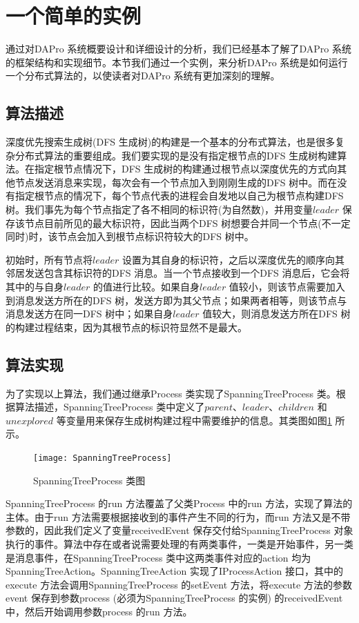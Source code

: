     \section{一个简单的实例}
    通过对DAPro 系统概要设计和详细设计的分析，我们已经基本了解了DAPro 系统的框架结构和实现细节。本节我们通过一个实例，来分析DAPro 系统是如何运行一个分布式算法的，以使读者对DAPro 系统有更加深刻的理解。

    \subsection{算法描述}
    深度优先搜索生成树(DFS 生成树)的构建是一个基本的分布式算法，也是很多复杂分布式算法的重要组成。我们要实现的是没有指定根节点的DFS 生成树构建算法。在指定根节点情况下，DFS 生成树的构建通过根节点以深度优先的方式向其他节点发送消息来实现，每次会有一个节点加入到刚刚生成的DFS 树中。而在没有指定根节点的情况下，每个节点代表的进程会自发地以自己为根节点构建DFS 树。我们事先为每个节点指定了各不相同的标识符(为自然数)，并用变量$leader$ 保存该节点目前所见的最大标识符，因此当两个DFS 树想要合并同一个节点(不一定同时)时，该节点会加入到根节点标识符较大的DFS 树中。

    初始时，所有节点将$leader$ 设置为其自身的标识符，之后以深度优先的顺序向其邻居发送包含其标识符的DFS 消息。当一个节点接收到一个DFS 消息后，它会将其中的与自身$leader$ 的值进行比较。如果自身$leader$ 值较小，则该节点需要加入到消息发送方所在的DFS 树，发送方即为其父节点；如果两者相等，则该节点与消息发送方在同一DFS 树中；如果自身$leader$ 值较大，则消息发送方所在DFS 树的构建过程结束，因为其根节点的标识符显然不是最大。

    \subsection{算法实现}
    为了实现以上算法，我们通过继承Process 类实现了SpanningTreeProcess 类。根据算法描述，SpanningTreeProcess 类中定义了$parent$、$leader$、$children$ 和$unexplored$ 等变量用来保存生成树构建过程中需要维护的信息。其类图如图\ref{SpanningTreeProcess} 所示。
    \begin{figure}[ht]
        \centering
        \texttt{[image: SpanningTreeProcess]}\\
        \caption{SpanningTreeProcess 类图}\label{SpanningTreeProcess}
    \end{figure}

    SpanningTreeProcess 的run 方法覆盖了父类Process 中的run 方法，实现了算法的主体。由于run 方法需要根据接收到的事件产生不同的行为，而run 方法又是不带参数的，因此我们定义了变量receivedEvent 保存交付给SpanningTreeProcess 对象执行的事件。算法中存在或者说需要处理的有两类事件，一类是开始事件，另一类是消息事件，在SpanningTreeProcess 类中这两类事件对应的action 均为SpanningTreeAction。SpanningTreeAction 实现了IProcessAction 接口，其中的execute 方法会调用SpanningTreeProcess 的setEvent 方法，将execute 方法的参数event 保存到参数process (必须为SpanningTreeProcess 的实例) 的receivedEvent 中，然后开始调用参数process 的run 方法。

